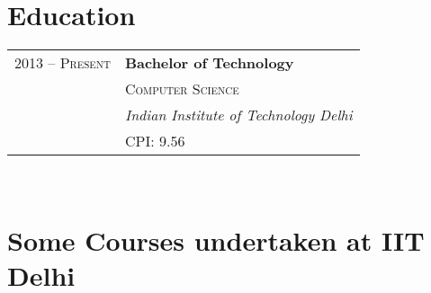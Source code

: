 \documentclass[10pt]{article} %
\begin{document}
{\begin{minipage}[t]{0.5\textwidth}
\end{minipage} %
\hfill
\begin{minipage}[t]{0.44\textwidth} %
\vspace{0pt} %




\section{Education} 

\begin{tabular}{rl} %


2013 -- \textsc{Present} & \textbf{Bachelor of Technology} \\ 
& \textsc{Computer Science} \\ 
& \textit{Indian Institute of Technology Delhi}\\
& CPI: 9.56

\end{tabular}\\[10pt]

\section{Some Courses undertaken at IIT Delhi} 


\end{minipage}}
\end{document}
